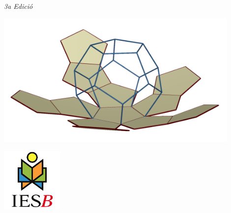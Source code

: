  
 \vspace*{0.5cm}
 

 \begin{center}
 	
 	\shadowoffset{2pt}
 	
	 \begin{blueshaded}
	 	\begin{center} 
	 	\vspace{0.5cm}
	 			
		{\fontsize{38}{57}\selectfont 
			\textbf{} 
		}
		 
		\vspace{1cm}
		\shadowoffset{1pt}
		{\huge \textbf{}}
	
		\vspace{1cm}
	
	{\Large \normalfont\textit{3a Edició}	}	
		\vspace{0.5cm}
\end{center}

\end{blueshaded}
 

 \vspace{1cm}
 
 \includegraphics[width=0.9\textwidth]{img-00/portada}

\vspace{1.5cm}

 
\begin{minipage}{0.4\textwidth}
\begin{center}
	\includegraphics*[width=1.2in]{img-00/ies-binissalem-logo}
 

\end{center}
\end{minipage}
\end{center}
